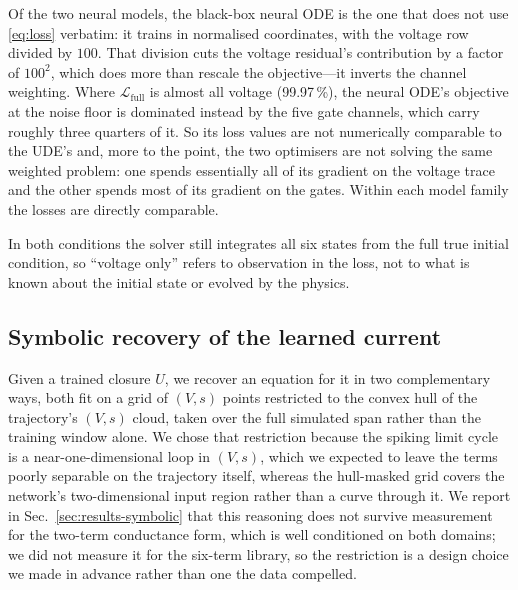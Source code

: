 \documentclass{article}
\newcommand{\LossShareV}{99.97}
\newcommand{\NodeScaleV}{100}       %
\begin{document}
Of the two neural models, the black-box neural ODE is the one that does not
use \eqref{eq:loss} verbatim: it trains in normalised coordinates, with the
voltage row divided by
$\NodeScaleV$. That division cuts the voltage residual's contribution by a factor
of $\NodeScaleV^{2}$, which does more than rescale the objective---it inverts the
channel weighting. Where $\mathcal{L}_{\mathrm{full}}$ is almost all voltage
(\LossShareV\,\%), the neural ODE's objective at the noise floor is dominated
instead by the five gate channels, which carry roughly three quarters of it. So
its loss values are not numerically comparable to the UDE's and, more to the
point, the two optimisers are not solving the same weighted problem: one spends
essentially all of its gradient on the voltage trace and the other spends most of
its gradient on the gates. Within each model family the losses are directly
comparable.

In both conditions the solver still integrates all six states from the full true
initial condition, so ``voltage only'' refers to observation in the loss, not to
what is known about the initial state or evolved by the physics.

\subsection{Symbolic recovery of the learned current}
\label{sec:methods-symbolic}

Given a trained closure $U$, we recover an equation for it in two complementary
ways, both fit on a grid of $(V,s)$ points restricted to the convex hull of the
trajectory's $(V,s)$ cloud, taken over the full simulated span rather than the
training window alone. We chose that restriction because the
spiking limit cycle is a near-one-dimensional loop in $(V,s)$, which we expected
to leave the terms poorly separable on the trajectory itself, whereas the
hull-masked grid covers the network's two-dimensional input region rather than a
curve through it.
We report in Sec.~\ref{sec:results-symbolic} that this reasoning does not
survive measurement for the two-term conductance form, which is well conditioned
on both domains; we did not measure it for the six-term library, so the
restriction is a design choice we made in advance rather than one the data
compelled.
\end{document}
